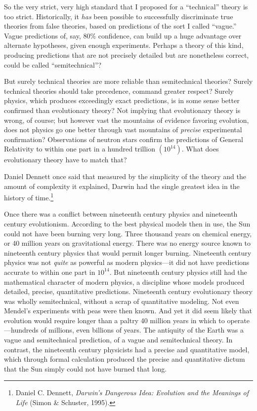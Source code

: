 {
 So the very strict, very high standard that I proposed for a
``technical'' theory is too strict.
Historically, it \textit{has} been possible to successfully
discriminate true theories from false theories, based on predictions of
the sort I called ``vague.'' Vague
predictions of, say, 80\% confidence, can build up a huge advantage
over alternate hypotheses, given enough experiments. Perhaps a theory
of this kind, producing predictions that are not precisely detailed but
are nonetheless correct, could be called
``semitechnical''?}

{
 But surely technical theories are more reliable than semitechnical
theories? Surely technical theories should take precedence, command
greater respect? Surely physics, which produces exceedingly exact
predictions, is in some sense better confirmed than evolutionary
theory? Not implying that evolutionary theory is wrong, of course; but
however vast the mountains of evidence favoring evolution, does not
physics go one better through vast mountains of \textit{precise}
experimental confirmation? Observations of neutron stars confirm the
predictions of General Relativity to within one part in a hundred
trillion $(10^{14})$. What does evolutionary theory have
to match that?}

{
 Daniel Dennett once said that measured by the simplicity of the
theory and the amount of complexity it explained, Darwin had the single
greatest idea in the history of time.\footnote{Daniel C. Dennett, \textit{Darwin's Dangerous
Idea: Evolution and the Meanings of Life} (Simon \& Schuster, 1995).}}

{
 Once there was a conflict between nineteenth century physics and
nineteenth century evolutionism. According to the best physical models
then in use, the Sun could not have been burning very long. Three
thousand years on chemical energy, or 40 million years on gravitational
energy. There was no energy source known to nineteenth century physics
that would permit longer burning. Nineteenth century physics was not
\textit{quite} as powerful as modern physics---it did not have
predictions accurate to within one part in $10^{14}$. But
nineteenth century physics still had the mathematical character of
modern physics, a discipline whose models produced detailed, precise,
quantitative predictions. Nineteenth century evolutionary theory was
wholly semitechnical, without a scrap of quantitative modeling. Not
even Mendel's experiments with peas were then known.
And yet it did seem likely that evolution would require longer than a
paltry 40 million years in which to operate---hundreds of millions,
even billions of years. The antiquity of the Earth was a vague and
semitechnical prediction, of a vague and semitechnical theory. In
contrast, the nineteenth century physicists had a precise and
quantitative model, which through formal calculation produced the
precise and quantitative dictum that the Sun simply could not have
burned that long.}

